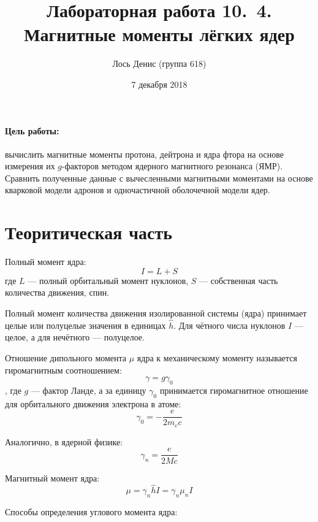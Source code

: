 \documentclass[12pt]{article}
\title{{\bf Лабораторная работа 10.\, 4. \\ Магнитные моменты лёгких ядер}}
\author{Лось Денис (группа 618)}
\date{7 декабря 2018}
\begin{document}
\maketitle

\paragraph*{Цель работы: } вычислить магнитные моменты протона, дейтрона и ядра фтора на основе измерения их $g$-факторов методом ядерного магнитного резонанса (ЯМР). Сравнить полученные данные с вычесленными магнитными моментами на основе кварковой модели адронов и одночастичной оболочечной модели ядер.

\section*{Теоритическая часть}
\par
	Полный момент ядра:
\[
	I = L + S
\]
где $L$ --- полный орбитальный момент нуклонов, $S$ --- собственная часть количества движения, спин.
\par
	Полный момент количества движения изолированной системы (ядра) принимает целые или полуцелые значения в единицах $\hat{h}$. Для чётного числа нуклонов $I$ --- целое, а для нечётного --- полуцелое.
\par
	Отношение дипольного момента $\mu$ ядра к механическому моменту называется гиромагнитным соотношением:
\[
	\gamma = g \gamma_0
\]
, где $g$ --- фактор Ланде, а за единицу $\gamma_0$ принимается гиромагнитное отношение для орбитального движения электрона в атоме:
\[
	\gamma_0 = - \frac{e}{2 m_e c}
\]
\par
	Аналогично, в ядерной физике:
\[
	\gamma_n = \frac{e}{2 M c}
\]
\par
	Магнитный момент ядра:
\[
	\mu = \gamma_n \hat{h} I = \gamma_n \mu_n I
\]
\par
	Способы определения углового момента ядра:
\end{document}
